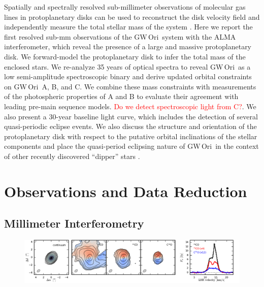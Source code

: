 \documentclass[twocolumn]{aastex61}
\newcommand{\todo}[1]{ \textcolor{red}{#1}}
\newcommand{\gw}{GW\,Ori}
\begin{document}
Spatially and spectrally resolved sub-millimeter observations of molecular gas lines in protoplanetary disks can be used to reconstruct the disk velocity field and independently measure the total stellar mass of the system \citep[e.g.,][]{rosenfeld12b,czekala15a,czekala16}. Here we report the first resolved sub-mm observations of the \gw\ system with the ALMA interferometer, which reveal the presence of a large and massive protoplanetary disk. We forward-model the protoplanetary disk to infer the total mass of the enclosed stars. We re-analyze 35 years of optical spectra to reveal \gw\ as a low semi-amplitude spectroscopic binary and derive updated orbital constraints on \gw\ A, B, and C. We combine these mass constraints with measurements of the photospheric properties of A and B to evaluate their agreement with leading pre-main sequence models. \todo{Do we detect spectroscopic light from C?}. We also present a 30-year baseline light curve, which includes the detection of several quasi-periodic eclipse events.  We also discuss the structure and orientation of the protoplanetary disk with respect to the putative orbital inclinations of the stellar components and place the quasi-period eclipsing nature of \gw\ in the context of other recently discovered ``dipper'' stars \citep[e.g.,][]{ansdell16b,ansdell16a}.

\section{Observations and Data Reduction \label{sec:obs}}


\subsection{Millimeter Interferometry}

\begin{figure}[ht!]
\begin{center}
  \includegraphics[width=\linewidth]{moments.pdf}
  \end{center}
\end{figure}
\end{document}
